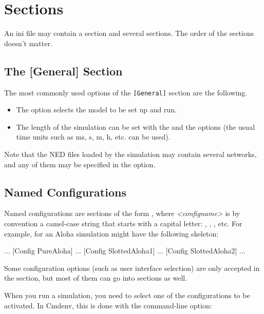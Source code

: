 \section{Sections}
\label{sec:ch-config-sim:general-section}

An ini file may contain a \ttt{[General]} section and several 
sections. The order of the sections doesn't matter.

\subsection{The [General] Section}

The most commonly used options of the \texttt{[General]} section are the
following.

\begin{itemize}
  \item{The  option selects the model to be set up and run.}
  \item{The length of the simulation can be set with the
     and the  options (the
    usual time units such as ms, s, m, h, etc. can be used).}
\end{itemize}

Note that the NED files loaded by the simulation may contain several
networks, and any of them may be specified in the 
option.


\subsection{Named Configurations}

Named configurations are sections of the form , where
\textit{<configname>} is by convention a camel-case string that starts with a capital letter:
, , , etc. For example,
 for an Aloha simulation might have the following skeleton:

\begin{inifile}
[General]
...
[Config PureAloha]
...
[Config SlottedAloha1]
...
[Config SlottedAloha2]
...
\end{inifile}

Some configuration options (such as user interface selection) are only
accepted in the \ttt{[General]} section, but most of them can go into 
sections as well.

When you run a simulation, you need to select one of the configurations
to be activated. In Cmdenv, this is done with the  command-line option:

